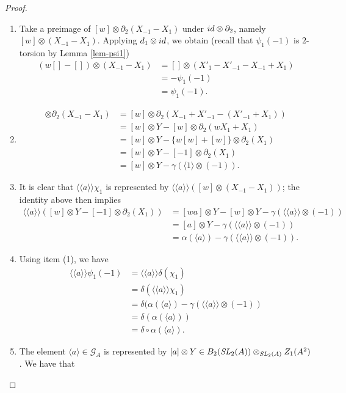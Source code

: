 \documentclass[10pt,a4paper]{amsart}
\newcommand{\GG}{\mathcal{G}}
\newcommand{\Lan}{\langle \! \langle}
\newcommand{\Ran}{\rangle \! \rangle}
\newcommand{\SL}{\mathit{{\rm SL}}}
\newcommand{\id}{{\rm id}}
\newcommand{\lan}{\langle}
\newcommand{\ran}{\rangle}
\begin{document}
\begin{proof}
\begin{enumerate}
    \item Take a preimage of $[w]\otimes \partial_2(X_{-1}-X_1)$ under $\id\otimes\partial_2$, namely $[w]\otimes(X_{-1}-X_1)$. Applying $d_1\otimes\id$, we obtain (recall that $\psi_1(-1)$ is $2$-torsion by Lemma \ref{lem-psi1})
    \begin{align*}
        (w[]-[])\otimes(X_{-1}-X_1)&=[]\otimes(X'_1-X'_{-1}-X_{-1}+X_1)\\
        &=-\psi_1(-1)\\
        &=\psi_1(-1).
    \end{align*}
    \item 
    \begin{align*}
        [w]\otimes\partial_2(X_{-1}-X_1)&=[w]\otimes\partial_2(X_{-1}+X'_{-1}-(X'_{-1}+X_1))\\
        &=[w]\otimes Y-[w]\otimes\partial_2(wX_1+X_1)\\
        &=[w]\otimes Y-\{w[w]+[w]\}\otimes\partial_2(X_1)\\
        &=[w]\otimes Y-[-1]\otimes\partial_2(X_1)\\
        &=[w]\otimes Y-\gamma(\lan 1\ran\otimes(-1)).
    \end{align*}
    \item It is clear that $\Lan a\Ran\chi_1$ is represented by $\Lan a\Ran([w]\otimes(X_{-1}-X_1))$; the identity above then implies
    \begin{align*}
        \Lan a\Ran([w]\otimes Y-[-1]\otimes\partial_2(X_1))&=[wa]\otimes Y - [w]\otimes Y-\gamma(\Lan a\Ran\otimes (-1))\\
        &=[a]\otimes Y-\gamma(\Lan a\Ran\otimes (-1))\\
        &=\alpha(\lan a\ran)-\gamma(\Lan a\Ran\otimes (-1)).
    \end{align*}
    \item Using item (1), we have
    \begin{align*}
        \Lan a\Ran\psi_1(-1)&=\Lan a\Ran\delta(\chi_1)\\
        &=\delta(\Lan a\Ran\chi_1)\\
        &=\delta(\alpha(\lan a\ran)-\gamma(\Lan a\Ran\otimes(-1))\\
        &=\delta(\alpha(\lan a\ran))\\
        &=\delta\circ\alpha(\lan a\ran).
    \end{align*}
    \item The element $\lan a\ran\in\GG_A$ is represented by $[a]\otimes Y\in B_2(\SL_2(A))\otimes_{\SL_2(A)} Z_1(A^2)$. We have that

\end{enumerate}
\end{proof}
\end{document}
